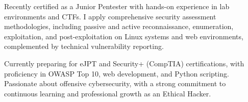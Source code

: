 \par{
Recently certified as a Junior Pentester with hands-on experience in lab environments and CTFs. I apply comprehensive security assessment methodologies, including passive and active reconnaissance, enumeration, exploitation, and post-exploitation on Linux systems and web environments, complemented by technical vulnerability reporting.

Currently preparing for eJPT and Security+ (CompTIA) certifications, with proficiency in OWASP Top 10, web development, and Python scripting. Passionate about offensive cybersecurity, with a strong commitment to continuous learning and professional growth as an Ethical Hacker.
}